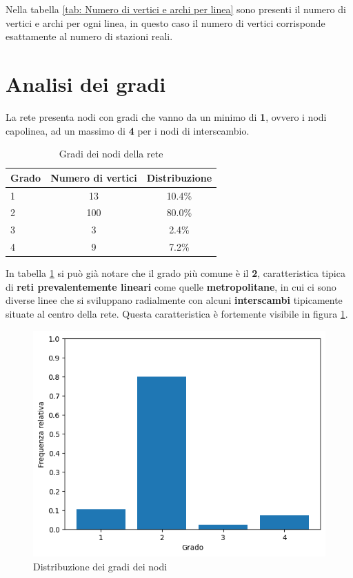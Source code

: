 Nella tabella \ref{tab: Numero di vertici e archi per linea} sono presenti il numero di vertici e archi per ogni linea, in questo caso il numero di vertici corrisponde esattamente al numero di stazioni reali.

\section{Analisi dei gradi}
La rete presenta nodi con gradi che vanno da un minimo di \textbf{1}, ovvero i nodi capolinea, ad un massimo di \textbf{4} per i nodi di interscambio.

\vspace{1em}
\begin{table}[h!]
\centering
\begin{tabular}{l c c}
\hline
\textbf{Grado} & \textbf{Numero di vertici} & \textbf{Distribuzione} \\
\hline
1 & 13 & 10.4\% \\
2 & 100 & 80.0\% \\
3 & 3 & 2.4\% \\
4 & 9 & 7.2\% \\
\hline
\end{tabular}
\caption{Gradi dei nodi della rete}
\label{tab: Gradi dei nodi della rete}
\end{table}
\vspace{1em}

In tabella \ref{tab: Gradi dei nodi della rete} si può già notare che il grado più comune è il \textbf{2}, caratteristica tipica di \textbf{reti prevalentemente lineari} come quelle \textbf{metropolitane}, in cui ci sono diverse linee che si sviluppano radialmente con alcuni \textbf{interscambi} tipicamente situate al centro della rete. Questa caratteristica è fortemente visibile in figura \ref{fig: Distribuzione dei gradi dei nodi}.

\vspace{1em}
\begin{figure}[h!]
    \centering
    \includegraphics[width=0.5\linewidth]{Immagini//Capitoli//cap3/dist_gradi.png}
    \caption{Distribuzione dei gradi dei nodi}
    \label{fig: Distribuzione dei gradi dei nodi}
\end{figure}
\vspace{1em}

